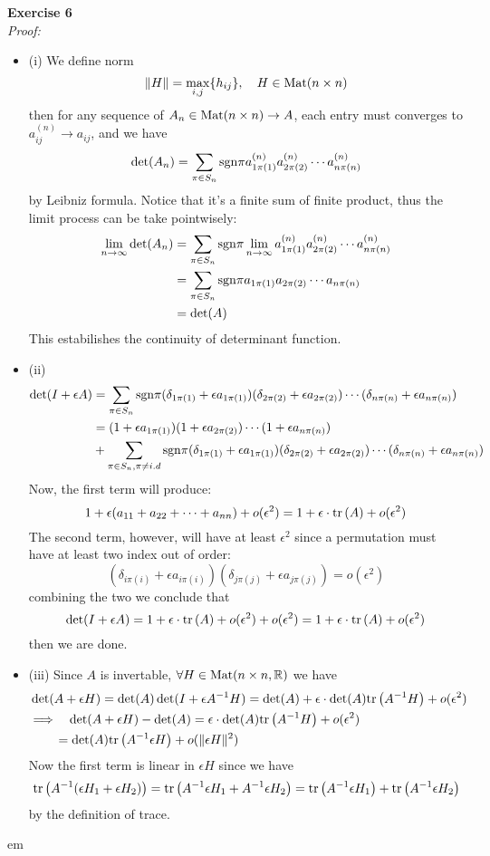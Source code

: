 \documentclass[12pt]{article}
\def\ep#1#2{{\bf Exercise #1}\\{\it Proof:}\begin{itemize}
 \setlength{\itemsep}{2pt}
 \setlength{\parskip}{0pt}
 \setlength{\parsep}{0pt}
 #2
 \end{itemize}\vskip 1 em}
\def\sgn{{\rm sgn}}
\def\mat#1{{\rm Mat}(#1\times #1,\mathbb{R})}
\def\tr#1{{\rm tr}\left(#1\right)}
\newcommand{\eq}[1]{\begin{align*}#1\end{align*}}
\begin{document}
\ep{6}{
\item[(i)] We define norm
$$
\|H\|=\max_{i,j}\{h_{ij}\}, \quad H\in {\rm Mat}(n\times n)
$$
then for any sequence of $A_n\in {\rm Mat}(n\times n)\to A$, each entry must converges to $a_{ij}^{(n)}\to a_{ij}$, and we have
$$
\det(A_n)= \sum_{\pi\in S_n}\sgn\pi a_{1\pi(1)}^{(n)}a_{2\pi(2)}^{(n)}\cdots a_{n\pi(n)}^{(n)}
$$
by Leibniz formula. Notice that it's a finite sum of finite product, thus the limit process can
be take pointwisely:
\eq{
\lim_{n\to\infty}\det(A_n)
&=\sum_{\pi\in S_n} \sgn\pi\lim_{n\to\infty}a_{1\pi(1)}^{(n)}a_{2\pi(2)}^{(n)}\cdots a_{n\pi(n)}^{(n)}\\
&=\sum_{\pi\in S_n} \sgn\pi a_{1\pi(1)}a_{2\pi(2)}\cdots a_{n\pi(n)}\\
&=\det(A)
}
This estabilishes the continuity of determinant function.
\item[(ii)]
\eq{
\det(I+\epsilon A)&=\sum_{\pi\in S_n}\sgn\pi(\delta_{1\pi(1)}+\epsilon a_{1\pi(1)})
(\delta_{2\pi(2)}+\epsilon a_{2\pi(2)})\cdots(\delta_{n\pi(n)}+\epsilon a_{n\pi(n)})\\
&=(1+\epsilon a_{1\pi(1)})
(1+\epsilon a_{2\pi(2)})\cdots(1+\epsilon a_{n\pi(n)})
\\
&+\sum_{\pi\in S_n,\pi\neq i.d}\sgn\pi(\delta_{1\pi(1)}+\epsilon a_{1\pi(1)})
(\delta_{2\pi(2)}+\epsilon a_{2\pi(2)})\cdots(\delta_{n\pi(n)}+\epsilon a_{n\pi(n)})
}
Now, the first term will produce:
$$
1+\epsilon(a_{11}+a_{22}+\cdots +a_{nn})+o(\epsilon^2)=1+\epsilon\cdot\tr A+o(\epsilon^2)
$$
The second term, however, will have at least $\epsilon^2$ since a permutation must 
have at least two index out of order:
$$
(\delta_{i\pi(i)}+\epsilon a_{i\pi(i)})(\delta_{j\pi(j)}+\epsilon a_{j\pi(j)})
=o(\epsilon^2)
$$
combining the two we conclude that
$$
\det(I+\epsilon A)=1+\epsilon\cdot\tr A+o(\epsilon^2)+o(\epsilon^2)=1+\epsilon\cdot\tr A+o(\epsilon^2)
$$
then we are done.
\item[(iii)] 
Since $A$ is invertable, $\forall H\in\mat{n}$ we have
\eq{
&\det(A+\epsilon H)=\det(A)\det(I+\epsilon A^{-1}H)
=\det(A)+\epsilon\cdot\det(A)\tr {A^{-1}H}+o(\epsilon^2)\\
&\Longrightarrow\quad \det(A+\epsilon H)-\det(A)=\epsilon\cdot\det(A)\tr {A^{-1}H}+o(\epsilon^2)\\
&\quad\quad=\det(A)\tr {A^{-1}\epsilon H}+o(\|\epsilon H\|^2)
}
Now the first term is linear in $\epsilon H$ since we have
$$
\tr{A^{-1}(\epsilon H_1+\epsilon H_2)}=\tr{A^{-1}\epsilon H_1+A^{-1}\epsilon H_2}
=\tr{A^{-1}\epsilon H_1}+\tr{A^{-1}\epsilon H_2}
$$
by the definition of trace. \\
}
\end{document}
